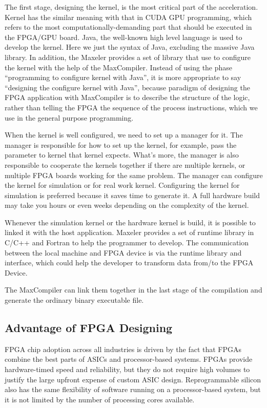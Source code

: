 The first stage, designing the kernel, is the most critical part of the
acceleration. Kernel has the similar meaning with that in CUDA GPU
programming, which refers to the most computationally-demanding part that
should be executed in the FPGA/GPU board. Java, the well-known high level
language is used to develop the kernel. Here we just the syntax of Java,
excluding the massive Java library. In addition, the Maxeler provides a set
of library that use to configure the kernel with the help of the
MaxCompiler. Instead of using the phase ``programming to configure kernel
with Java'', it is more appropriate to say ``designing the configure kernel
with Java'', because paradigm of designing the FPGA application with
MaxCompiler is to describe the structure of the logic, rather than telling
the FPGA the sequence of the process instructions, which we use in the
general purpose programming.

When the kernel is well configured, we need to set up a manager for it. The
manager is responsible for how to set up the kernel, for example, pass the
parameter to kernel that kernel expects. What's more, the manager is also
responsible to cooperate the kernels together if there are multiple
kernels, or multiple FPGA boards working for the same problem. The manager
can configure the kernel for simulation or for real work kernel.
Configuring the kernel for simulation is preferred because it saves time to
generate it. A full hardware build may take you hours or even weeks
depending on the complexity of the kernel.

Whenever the simulation kernel or the hardware kernel is build, it is
possible to linked it with the host application. Maxeler provides a set of
runtime library in C/C++ and Fortran to help the programmer to develop. The
communication between the local machine and FPGA device is via the runtime
library and interface, which could help the developer to transform data
from/to the FPGA Device.

The MaxCompiler can link them together in the last stage of the compilation
and generate the ordinary binary executable file.

\subsection{Advantage of FPGA Designing}

FPGA chip adoption across all industries is driven by the fact that FPGAs
combine the best parts of ASICs and processor-based systems. FPGAs provide
hardware-timed speed and reliability, but they do not require high volumes
to justify the large upfront expense of custom ASIC design. Reprogrammable
silicon also has the same flexibility of software running on a
processor-based system, but it is not limited by the number of processing
cores available.

